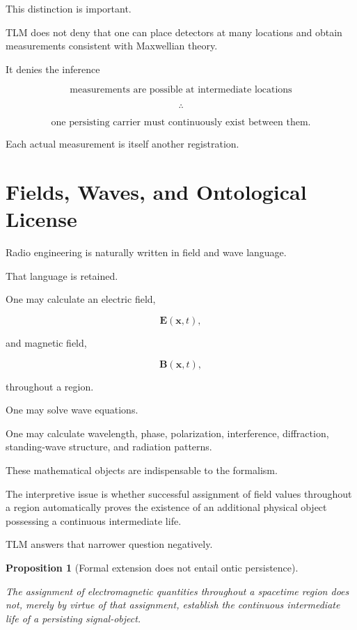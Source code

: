 \documentclass[12pt,onecolumn]{article}
\newtheorem{proposition}{Proposition}[section]
\begin{document}
This distinction is important.

TLM does not deny that one can place detectors at many locations and
obtain measurements consistent with Maxwellian theory.

It denies the inference

\[
\text{measurements are possible at intermediate locations}
\]

\[
\therefore
\]

\[
\text{one persisting carrier must continuously exist between them}.
\]

Each actual measurement is itself another registration.

\section{Fields, Waves, and Ontological License}

Radio engineering is naturally written in field and wave language.

That language is retained.

One may calculate an electric field,

\[
\mathbf{E}(\mathbf{x},t),
\]

and magnetic field,

\[
\mathbf{B}(\mathbf{x},t),
\]

throughout a region.

One may solve wave equations.

One may calculate wavelength, phase, polarization, interference,
diffraction, standing-wave structure, and radiation patterns.

These mathematical objects are indispensable to the formalism.

The interpretive issue is whether successful assignment of field values
throughout a region automatically proves the existence of an additional
physical object possessing a continuous intermediate life.

TLM answers that narrower question negatively.

\begin{proposition}[Formal extension does not entail ontic persistence]
\label{prop:fieldontology}

The assignment of electromagnetic quantities throughout a spacetime
region does not, merely by virtue of that assignment, establish the
continuous intermediate life of a persisting signal-object.

\end{proposition}
\end{document}
